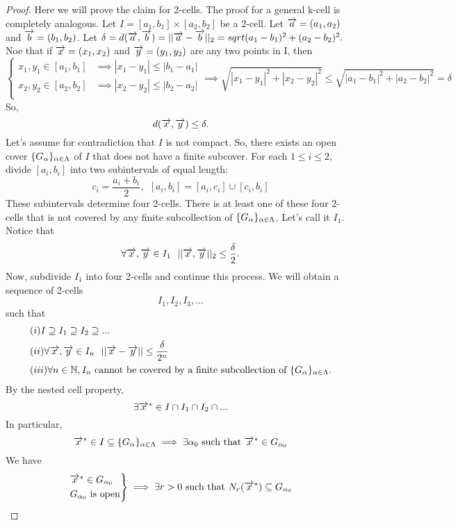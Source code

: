 	\begin{proof}
		Here we will prove the claim for 2-cells. The proof for a general k-cell is completely analogous.
		Let $I = [a_1,b_1] \times [a_2,b_2]$ be a 2-cell. Let $\overrightarrow{a}=(a_1,a_2)$ and $\overrightarrow{b}=(b_1,b_2)$.
		Let $\delta = d(\overrightarrow{a}, \overrightarrow{b})= ||\overrightarrow{a} - \overrightarrow{b}||_2 = sqrt{(a_1-b_1)^2+(a_2-b_2)^2}.$
		Noe that if $\overrightarrow{x}=(x_1,x_2)$ and $\overrightarrow{y}=(y_1,y_2)$ are any two points in I, then
		$$\begin{cases}
			x_1,y_1 \in [a_1,b_1] &\implies |x_1 - y_1| \leq |b_1 - a_1| \\
			x_2,y_2 \in [a_2,b_2] &\implies |x_2 - y_2| \leq |b_2 - a_2| \\
		\end{cases}
		\implies \sqrt{|x_1-y_1|^2+|x_2-y_2|^2} \leq \sqrt{|a_1-b_1|^2+|a_2-b_2|^2} = \delta$$
		So, $$d(\overrightarrow{x}, \overrightarrow{y}) \leq \delta.$$
		Let's assume for contradiction that $I$ is not compact. So, there exists an open cover $\{G_\alpha \}_{\alpha \in \Lambda}$ of $I$ that does not have a finite subcover.
		For each $1 \leq i \leq 2$, divide $[a_i, b_i]$ into two subintervals of equal length:
		$$c_i= \frac{a_i + b_i}{2}, ~~ [a_i,b_i]=[a_i, c_i] \cup [c_i, b_i]$$
		These subintervals determine four 2-cells. There is at least one of these four 2-cells that is not covered by any finite subcollection of $\{G_\alpha \}_{\alpha \in \Lambda}$.
		Let's call it $I_1$. Notice that
		$$\forall \overrightarrow{x}, \overrightarrow{y} \in I_1 ~~ ||\overrightarrow{x}, \overrightarrow{y}||_2 \leq \frac{\delta}{2}.$$
		Now, subdivide $I_1$ into four 2-cells and continue this process. We will obtain a sequence of 2-cells
		$$I_1, I_2, I_3, ... $$
		such that
		\begin{align*}
			&(i) I \supseteq I_1 \supseteq I_2 \supseteq ... \\
			&(ii) \forall \overrightarrow{x}, \overrightarrow{y} \in I_n ~~ ||\overrightarrow{x}-\overrightarrow{y}|| \leq \frac{\delta}{2^n} \\
			&(iii) \forall n \in \mathbb{N}, I_n \text{ cannot be covered by a finite subcollection of } \{G_\alpha \}_{\alpha \in \Lambda}.
		\end{align*}
		By the nested cell property,
		$$\exists \overrightarrow{x}^* \in I\cap I_1 \cap I_2 \cap...$$
		In particular,
		$$\overrightarrow{x}^* \in I \subseteq \{G_\alpha \}_{\alpha \in \Lambda} \implies \exists \alpha_0 \text{ such that } \overrightarrow{x}^* \in G_{\alpha_0}$$
		We have
		$$\begin{rcases}
			\overrightarrow{x}^* \in G_{\alpha_0} \\
			G_{\alpha_0} \text{ is open}
		\end{rcases}
		\implies \exists r > 0 \text{ such that } N_r(\overrightarrow{x}^*) \subseteq G_{\alpha_0}$$

\end{proof}
